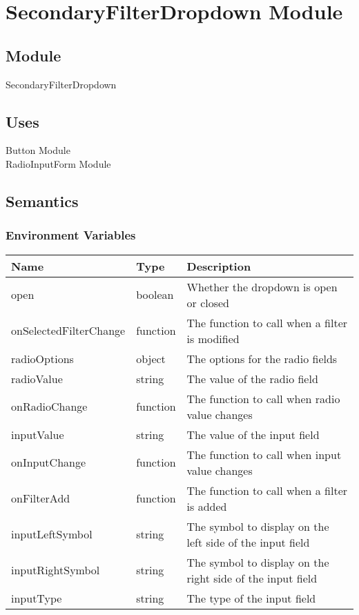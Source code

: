\documentclass[12pt]{article}
\begin{document}
\newpage


\section{SecondaryFilterDropdown Module}

\subsection{Module}
SecondaryFilterDropdown

\subsection{Uses}
Button Module\\
RadioInputForm Module

\subsection{Semantics}

\subsubsection{Environment Variables}
\begin{tabular}{| l | l | p{10cm} |}
    \hline
    \textbf{Name} & \textbf{Type} & \textbf{Description}\\ \hline
    open & boolean & Whether the dropdown is open or closed\\ \hline
    onSelectedFilterChange & function & The function to call when a filter is modified\\ \hline
    radioOptions & object & The options for the radio fields\\ \hline
    radioValue & string & The value of the radio field\\ \hline
    onRadioChange & function & The function to call when radio value changes\\ \hline
    inputValue & string & The value of the input field\\ \hline
    onInputChange & function & The function to call when input value changes\\ \hline
    onFilterAdd & function & The function to call when a filter is added\\ \hline
    inputLeftSymbol & string & The symbol to display on the left side of the input field\\ \hline
    inputRightSymbol & string & The symbol to display on the right side of the input field\\ \hline
    inputType & string & The type of the input field\\ \hline

\end{tabular}
\end{document}
